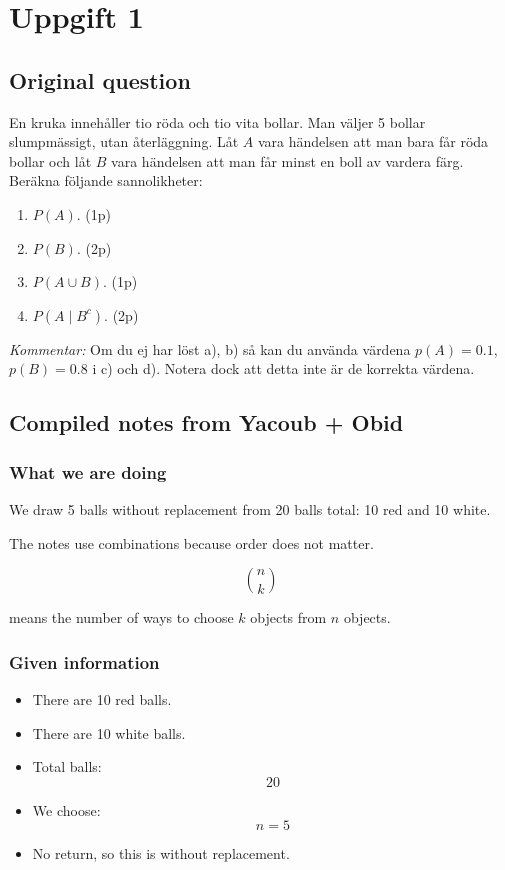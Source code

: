 \documentclass[10pt]{article}
\begin{document}
\section*{Uppgift 1}

\subsection*{Original question}
En kruka innehåller tio röda och tio vita bollar.
Man väljer 5 bollar slumpmässigt, utan återläggning.
Låt $A$ vara händelsen att man bara får röda bollar och låt
$B$ vara händelsen att man får minst en boll av vardera färg.
Beräkna följande sannolikheter:

\begin{enumerate}[label=\alph*)]
\item $P(A)$. \hfill (1p)
\item $P(B)$. \hfill (2p)
\item $P(A\cup B)$. \hfill (1p)
\item $P(A\mid B^c)$. \hfill (2p)
\end{enumerate}

\textit{Kommentar:}
Om du ej har löst a), b) så kan du använda värdena
$p(A)=0.1$, $p(B)=0.8$ i c) och d).
Notera dock att detta inte är de korrekta värdena.

\subsection*{Compiled notes from Yacoub + Obid}

\subsubsection*{What we are doing}
We draw 5 balls without replacement from 20 balls total:
10 red and 10 white.

The notes use combinations because order does not matter.

\[
\binom{n}{k}
\]

means the number of ways to choose $k$ objects from $n$ objects.

\subsubsection*{Given information}
\begin{itemize}
\item There are 10 red balls.
\item There are 10 white balls.
\item Total balls:
\[
20
\]
\item We choose:
\[
n=5
\]
\item No return, so this is without replacement.
\end{itemize}
\end{document}
